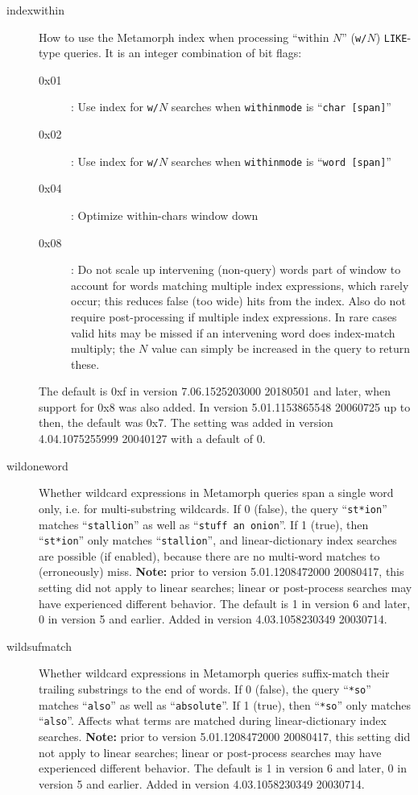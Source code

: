 \begin{description}
\item[indexwithin] How to use the Metamorph index when processing
  ``within $N$'' ({\tt w/$N$}) \verb`LIKE`-type queries.  It is an
  integer combination of bit flags:
  \begin{description}
    \item[0x01]: Use index for {\tt w/$N$} searches
                  when \verb`withinmode` is ``\verb`char [span]`''
    \item[0x02]: Use index for {\tt w/$N$} searches
                  when \verb`withinmode` is ``\verb`word [span]`''
    \item[0x04]: Optimize within-chars window down
    \item[0x08]: Do not scale up intervening (non-query) words part of
      window to account for words matching multiple index expressions,
      which rarely occur; this reduces false (too wide) hits from the
      index.  Also do not require post-processing if multiple index
      expressions.  In rare cases valid hits may be missed if an
      intervening word does index-match multiply; the {\tt $N$} value
      can simply be increased in the query to return these.
  \end{description}
  The default is 0xf in version 7.06.1525203000 20180501 and later,
  when support for 0x8 was also added.  In version 5.01.1153865548
  20060725 up to then, the default was 0x7.  The setting was added in
  version 4.04.1075255999 20040127 with a default of 0.

\item[wildoneword] 
  Whether wildcard expressions in Metamorph queries span a single word
  only, i.e. for multi-substring wildcards.  If 0 (false), the query
  ``\verb`st*ion`'' matches ``\verb`stallion`'' as well as
  ``{\tt stuff an onion}''.  If 1 (true), then ``\verb`st*ion`'' only matches
  ``\verb`stallion`'', and linear-dictionary index searches are
  possible (if enabled), because there are no multi-word matches to
  (erroneously) miss.  {\bf Note:} prior to version 5.01.1208472000
  20080417, this setting did not apply to linear searches; linear or
  post-process searches may have experienced different behavior.
  The default is 1 in version 6 and later, 0 in version 5 and earlier.
  Added in version 4.03.1058230349 20030714.

\item[wildsufmatch]
  Whether wildcard expressions in Metamorph queries suffix-match their
  trailing substrings to the end of words.  If 0 (false), the query
  ``\verb`*so`'' matches ``\verb`also`'' as well as
  ``\verb`absolute`''.  If 1 (true), then ``\verb`*so`'' only matches
  ``\verb`also`''.  Affects what terms are matched during
  linear-dictionary index searches.  {\bf Note:} prior to version
  5.01.1208472000 20080417, this setting did not apply to linear
  searches; linear or post-process searches may have experienced
  different behavior.  The default is 1 in version 6 and later, 0 in
  version 5 and earlier.  Added in version 4.03.1058230349 20030714.


\end{description}
